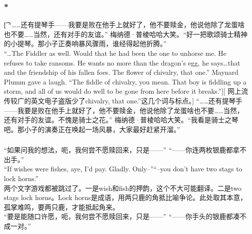 \documentclass[12pt,a4paper]{article}
\newcommand{\h}[1]{{\color{red}#1}\\}
\newcommand{\la}[1]{{\color{blue}#1}\\}
\begin{document}
\subsubsection{\color{red}*}\t[
	“……还有提琴手——我要是败在他手上就好了，他不要赎金，他说他除了龙蛋啥也不要……当然，还有对手的友谊。”
	梅纳德·普棱哈哈大笑。“好一把歌颂骑士精神的小提琴。那小子正奏响暴风骤雨，谁经得起他折腾。”\\
	“\ldots The Fiddler as well. Would that he had been the one to unhorse me. He refuses to take ransoms. He wants no more than the dragon's egg, he says\ldots that and the friendship of his fallen foes. The flower of chivalry, that one.”
	Maynard Plumm gave a laugh. “The fiddle of chivalry, you mean. That boy is fiddling up a storm, and all of us would do well to be gone from here before it breaks.”][
	网上流传较广的英文电子盗版少了chivalry, that one.”这几个词与标点。]
	“……还有提琴手——我要是败在他手上就好了，他不要赎金，他说他除了龙蛋啥也不要……当然，还有对手的友谊。不愧是骑士之花。”
	梅纳德·普棱哈哈大笑。“我看是骑士之琴吧。那小子的演奏正在唤起一场风暴，大家最好赶紧开溜。”
	
\subsubsection{}\la{
	“如果问我的想法，呃，我何尝不愿赎回来，只是——” “——你连两枚银鹿都拿不出手。”\\
	“If wishes were fishes, aye, I'd pay. Gladly. Only--”“--you don't have two stags to lock horns.”}\h{
	两个文字游戏都被跳过了。一是wish和fish的押韵，这个不大可能翻译。二是two stags  lock horns。Lock horns是成语，用两只鹿的角抵比喻争论。此处取其本意，孤掌难鸣，要两只鹿，才能抵起角来。}
	“要是能随口许愿，呃，我何尝不愿赎回来，只是——” “——你手头的银鹿都凑不成一对。”
	
\end{document}
